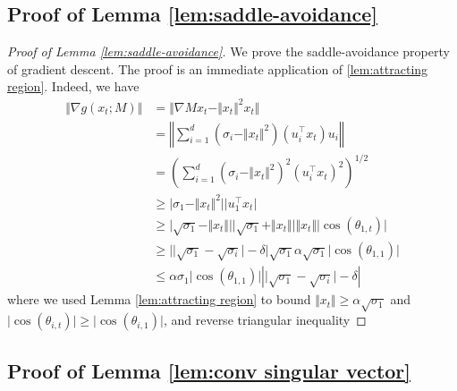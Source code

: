 \subsection{Proof of Lemma \ref{lem:saddle-avoidance}}\label{sec:proof saddle}


\begin{proof}[Proof of Lemma \ref{lem:saddle-avoidance}]
    We prove the saddle-avoidance property of gradient descent. The proof is an immediate application of \ref{lem:attracting region}. Indeed, we have 
    \begin{align*}
        \Vert \nabla g(x_t; M) \Vert & = \Vert \nabla Mx_t - \Vert x_t \Vert^2 x_t  \Vert \\
        & = \left\Vert   \sum_{i=1}^d (\sigma_i - \Vert x_t\Vert^2)  (u_i^\top x_t) u_i \right\Vert \\
        & = \left(\sum_{i=1}^d (\sigma_i - \Vert x_t\Vert^2)^2  (u_i^\top x_t)^2 \right)^{1/2} \\
        & \ge \vert \sigma_1 - \Vert x_t\Vert^2\vert   \vert u_1^\top x_t\vert  \\
        & \ge \vert \sqrt{\sigma_1} - \Vert x_t\Vert\vert      
         \vert \sqrt{\sigma_1} + \Vert x_t\Vert\vert  \Vert x_t  \Vert \vert \cos(\theta_{1,t})\vert \\
        & \ge   \vert \vert \sqrt{\sigma_1} - \sqrt{\sigma_i}\vert - \delta \vert    \sqrt{\sigma_1} \alpha \sqrt{\sigma_1} \vert \cos(\theta_{1,1})\vert  \\
        & \le \alpha \sigma_1 \vert \cos(\theta_{1,1})\vert \left\vert \vert \sqrt{\sigma_1} - \sqrt{\sigma_i}\vert - \delta \right\vert 
    \end{align*}
    where we used Lemma \ref{lem:attracting region} to bound $\Vert x_t \Vert \ge \alpha \sqrt{\sigma_1}$ and $\vert\cos(\theta_{i,t})\vert \ge \vert\cos(\theta_{i,1})\vert$, and reverse triangular inequality
\end{proof}
 




\subsection{Proof of Lemma \ref{lem:conv singular vector}}\label{sec:proof conv singular vector}


